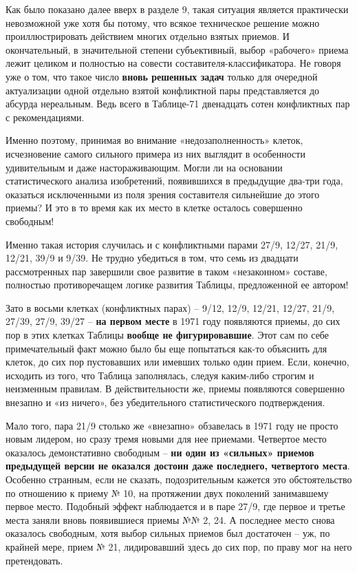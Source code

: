 \documentclass[11pt,a4paper]{article}
\begin{document}
Как было показано далее вверх в разделе 9, такая ситуация является практически
невозможной уже хотя бы потому, что всякое техническое решение можно
проиллюстрировать действием многих отдельно взятых приемов. И окончательный, в
значительной степени субъективный, выбор «рабочего» приема лежит целиком и
полностью на совести составителя-классификатора. Не говоря уже о том, что
такое число \textbf{вновь решенных задач} только для очередной актуализации
одной отдельно взятой конфликтной пары представляется до абсурда нереальным.
Ведь всего в Таблице-71 двенадцать сотен конфликтных пар с рекомендациями.

Именно поэтому, принимая во внимание «недозаполненность» клеток, исчезновение
самого сильного примера из них выглядит в особенности удивительным и даже
настораживающим. Могли ли на основании статистического анализа изобретений,
появившихся в предыдущие два-три года, оказаться исключенными из поля зрения
составителя сильнейшие до этого приемы? И это в то время как их место в клетке
осталось совершенно свободным!

Именно такая история случилась и с конфликтными парами 27/9, 12/27, 21/9,
12/21, 39/9 и 9/39. Не трудно убедиться в том, что семь из двадцати
рассмотренных пар завершили свое развитие в таком «незаконном» составе,
полностью противоречащем логике развития Таблицы, предложенной ее автором!

Зато в восьми клетках (конфликтных парах) -- 9/12, 12/9, 12/21, 12/27, 21/9,
27/39, 27/9, 39/27 -- \textbf{на первом месте} в 1971 году появляются приемы,
до сих пор в этих клетках Таблицы \textbf{вообще не фигурировавшие}. Этот сам
по себе примечательный факт можно было бы еще попытаться как-то объяснить для
клеток, до сих пор пустовавших или имевших только один прием. Если, конечно,
исходить из того, что Таблица заполнялась, следуя каким-либо строгим и
неизменным правилам. В действительности же, приемы появляются совершенно
внезапно и «из ничего», без убедительного статистического подтверждения.

Мало того, пара 21/9 столько же «внезапно» обзавелась в 1971 году не просто
новым лидером, но сразу тремя новыми для нее приемами. Четвертое место
оказалось демонстативно свободным -- \textbf{ни один из «сильных» приемов
  предыдущей версии не оказался достоин даже последнего, четвертого места}.
Особенно странным, если не сказать, подозрительным кажется это обстоятельство
по отношению к приему № 10, на протяжении двух поколений занимавшему первое
место. Подобный эффект наблюдается и в паре 27/9, где первое и третье места
заняли вновь появившиеся приемы №№ 2, 24. А последнее место снова оказалось
свободным, хотя выбор сильных приемов был достаточен -- уж, по крайней мере,
прием № 21, лидировавший здесь до сих пор, по праву мог на него претендовать.
\end{document}
